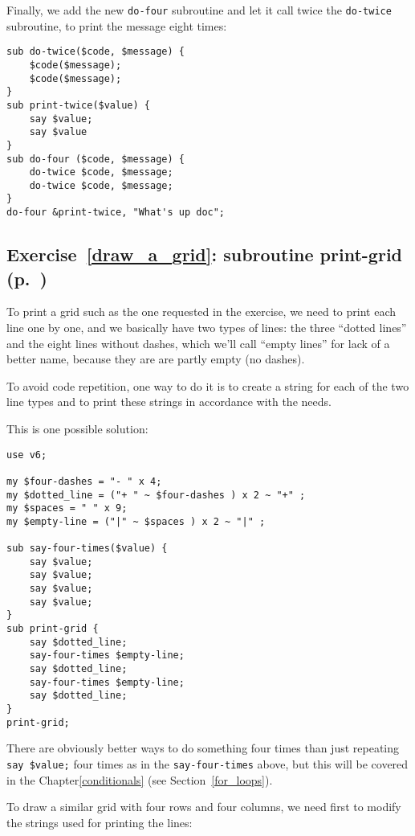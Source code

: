 Finally, we add the new {\tt do-four} subroutine and let 
it call twice the {\tt do-twice} subroutine, to print the 
message eight times:

\begin{verbatim}
sub do-twice($code, $message) {
    $code($message); 
    $code($message);
}
sub print-twice($value) {
    say $value;
    say $value
}
sub do-four ($code, $message) {
    do-twice $code, $message;
    do-twice $code, $message;
}
do-four &print-twice, "What's up doc";
\end{verbatim}

\subsection{Exercise~\ref{draw_a_grid}: subroutine print-grid 
(p.~\pageref{draw_a_grid})}
\label{sol_draw_a_grid}

To print a grid such as the one requested in the exercise, 
we need to print each line one by one, and we basically 
have two types of lines: the three ``dotted lines'' and 
the eight lines without dashes, which we'll call ``empty 
lines'' for lack of a better name, because they are are 
partly empty (no dashes).

To avoid code repetition, one way to do it is to create 
a string for each of the two line types and to print 
these strings in accordance with the needs.

This is one possible solution:

\begin{verbatim}
use v6;

my $four-dashes = "- " x 4;
my $dotted_line = ("+ " ~ $four-dashes ) x 2 ~ "+" ;
my $spaces = " " x 9;
my $empty-line = ("|" ~ $spaces ) x 2 ~ "|" ;

sub say-four-times($value) {
    say $value;
    say $value;
    say $value;
    say $value;
}
sub print-grid {
    say $dotted_line;
    say-four-times $empty-line;
    say $dotted_line;
    say-four-times $empty-line;
    say $dotted_line;
}
print-grid;
\end{verbatim}

There are obviously better ways to do something four times 
than just repeating \verb'say $value;' four times as in the 
{\tt say-four-times} above, but this will be covered in 
the Chapter\ref{conditionals} (see Section~\ref{for_loops}).

To draw a similar grid with four rows and four columns, we need 
first to modify the strings used for printing the lines:

